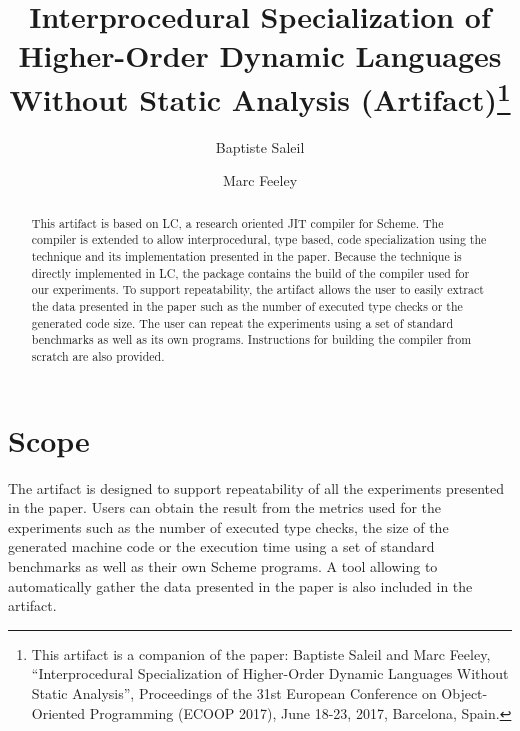 \documentclass[a4paper,UKenglish]{darts}
\title{Interprocedural Specialization of Higher-Order Dynamic Languages Without Static Analysis (Artifact)\footnote{This artifact is a companion of the paper:  Baptiste Saleil and Marc Feeley, ``Interprocedural Specialization of Higher-Order Dynamic Languages Without Static Analysis'', Proceedings of the 31st European Conference on Object-Oriented Programming (ECOOP 2017), June 18-23, 2017, Barcelona, Spain.}}
\author[1]{Baptiste Saleil}
\author[2]{Marc Feeley}
\affil[1]{Universit\'e de Montr\'eal\\
  Montreal, Quebec, Canada\\
  \texttt{baptiste.saleil@umontreal.ca}}
\affil[2]{Universit\'e de Montr\'eal\\
  Montreal, Quebec, Canada\\
  \texttt{feeley@iro.umontreal.ca}}
\newenvironment{scope}{\section{Scope}}{}
\begin{document}
\maketitle

\begin{abstract}
    This artifact is based on LC, a research oriented JIT compiler for Scheme.
    The compiler is extended to allow interprocedural, type based, code specialization
    using the technique and its implementation presented in the paper.
    Because the technique is directly implemented in LC, the package contains the build
    of the compiler used for our experiments.
    To support repeatability, the artifact allows the user to
    easily extract the data presented in the paper such as the number of executed type
    checks or the generated code size.
    The user can repeat the experiments using a set of standard benchmarks as well as its own programs.
    Instructions for building the compiler from scratch are also provided.
\end{abstract}

\begin{scope}
    The artifact is designed to support repeatability of all the experiments presented in the paper.
    Users can obtain the result from the metrics used for the experiments such as the number of executed type checks,
    the size of the generated machine code or the execution time using a set of standard benchmarks as well
    as their own Scheme programs.
    A tool allowing to automatically gather the data presented in the paper is also included in the artifact.
\end{scope}
\end{document}
